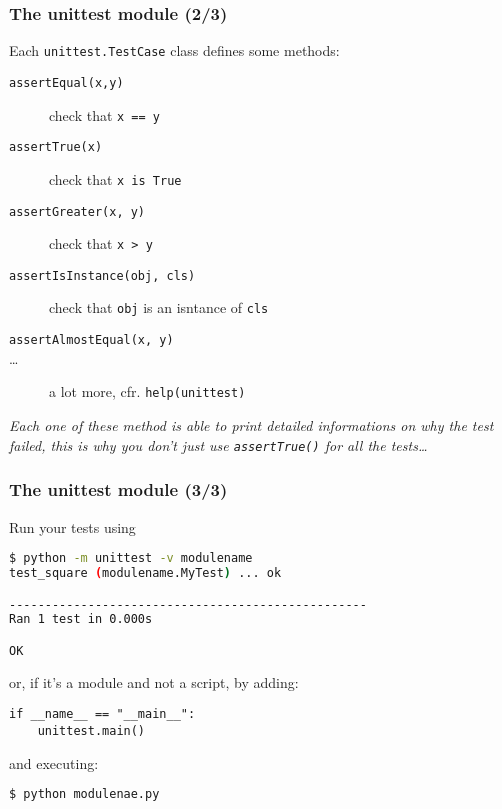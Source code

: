 \documentclass[english,serif,mathserif,xcolor=pdftex,dvipsnames,table]{beamer}
\begin{document}
\begin{frame}[fragile]
  \frametitle{The unittest module (2/3)}

  Each \lstinline|unittest.TestCase| class defines some methods:
  \begin{description}
  \item [\texttt{assertEqual(x,y)}] check that \lstinline|x == y|
  \item[\texttt{assertTrue(x)}] check that \lstinline|x is True|
  \item[\texttt{assertGreater(x, y)}] check that \lstinline|x > y|
  \item[\texttt{assertIsInstance(obj, cls)}] check that
    \lstinline|obj| is an isntance of \lstinline|cls|
  \item[\texttt{assertAlmostEqual(x, y)}] 
  \item[\ldots] a lot more, cfr. \lstinline|help(unittest)|
  \end{description}

  \+
\textit{Each one of these method is able to print detailed informations on
  why the test failed, this is why you don't just use
  \texttt{assertTrue()} for all the tests\ldots}

\end{frame}

\begin{frame}[fragile]
\frametitle{The unittest module (3/3)}
Run your tests using
\+
  \begin{lstlisting}[language=sh]
$ python -m unittest -v modulename
test_square (modulename.MyTest) ... ok

--------------------------------------------------
Ran 1 test in 0.000s

OK
\end{lstlisting}

or, if it's a module and not a script, by adding:
\begin{lstlisting}
if __name__ == "__main__":
    unittest.main()  
\end{lstlisting}
and executing:

\begin{lstlisting}[language=sh]
$ python modulenae.py
\end{lstlisting}%

\end{frame}
\end{document}
